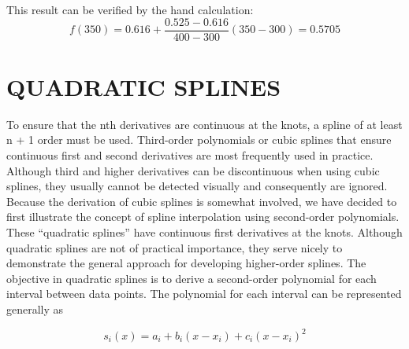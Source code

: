 \documentclass[../main.tex]{subfiles}
\begin{document}
This result can be verified by the hand calculation:
\begin{equation}
    f(350)=0.616+\frac{0.525-0.616}{400-300}(350-300)=0.5705 \nonumber
    \end{equation}

\section{QUADRATIC SPLINES}

To ensure that the nth derivatives are continuous at the knots, a spline of at least n + 1
order must be used. Third-order polynomials or cubic splines that ensure continuous first
and second derivatives are most frequently used in practice. Although third and higher
derivatives can be discontinuous when using cubic splines, they usually cannot be detected
visually and consequently are ignored.
Because the derivation of cubic splines is somewhat involved, we have decided to first
illustrate the concept of spline interpolation using second-order polynomials. These “quadratic splines” have continuous first derivatives at the knots. Although quadratic splines are
not of practical importance, they serve nicely to demonstrate the general approach for developing higher-order splines.
The objective in quadratic splines is to derive a second-order polynomial for each interval between data points. The polynomial for each interval can be represented generally as

\begin{equation}
    \tag{18.5}
    s_{i}(x)=a_{i}+b_{i}\left(x-x_{i}\right)+c_{i}\left(x-x_{i}\right)^{2}
\end{equation}
\end{document}
